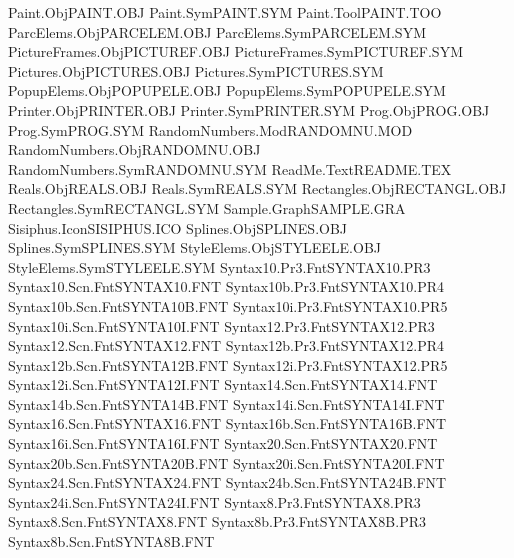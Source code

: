 Paint.Obj                       PAINT.OBJ    
Paint.Sym                       PAINT.SYM    
Paint.Tool                      PAINT.TOO    
ParcElems.Obj                   PARCELEM.OBJ 
ParcElems.Sym                   PARCELEM.SYM 
PictureFrames.Obj               PICTUREF.OBJ 
PictureFrames.Sym               PICTUREF.SYM 
Pictures.Obj                    PICTURES.OBJ 
Pictures.Sym                    PICTURES.SYM 
PopupElems.Obj                  POPUPELE.OBJ 
PopupElems.Sym                  POPUPELE.SYM 
Printer.Obj                     PRINTER.OBJ  
Printer.Sym                     PRINTER.SYM  
Prog.Obj                        PROG.OBJ     
Prog.Sym                        PROG.SYM     
RandomNumbers.Mod               RANDOMNU.MOD 
RandomNumbers.Obj               RANDOMNU.OBJ 
RandomNumbers.Sym               RANDOMNU.SYM 
ReadMe.Text                     README.TEX   
Reals.Obj                       REALS.OBJ    
Reals.Sym                       REALS.SYM    
Rectangles.Obj                  RECTANGL.OBJ 
Rectangles.Sym                  RECTANGL.SYM 
Sample.Graph                    SAMPLE.GRA   
Sisiphus.Icon                   SISIPHUS.ICO 
Splines.Obj                     SPLINES.OBJ  
Splines.Sym                     SPLINES.SYM  
StyleElems.Obj                  STYLEELE.OBJ 
StyleElems.Sym                  STYLEELE.SYM 
Syntax10.Pr3.Fnt                SYNTAX10.PR3 
Syntax10.Scn.Fnt                SYNTAX10.FNT 
Syntax10b.Pr3.Fnt               SYNTAX10.PR4 
Syntax10b.Scn.Fnt               SYNTA10B.FNT 
Syntax10i.Pr3.Fnt               SYNTAX10.PR5 
Syntax10i.Scn.Fnt               SYNTA10I.FNT 
Syntax12.Pr3.Fnt                SYNTAX12.PR3 
Syntax12.Scn.Fnt                SYNTAX12.FNT 
Syntax12b.Pr3.Fnt               SYNTAX12.PR4 
Syntax12b.Scn.Fnt               SYNTA12B.FNT 
Syntax12i.Pr3.Fnt               SYNTAX12.PR5 
Syntax12i.Scn.Fnt               SYNTA12I.FNT 
Syntax14.Scn.Fnt                SYNTAX14.FNT 
Syntax14b.Scn.Fnt               SYNTA14B.FNT 
Syntax14i.Scn.Fnt               SYNTA14I.FNT 
Syntax16.Scn.Fnt                SYNTAX16.FNT 
Syntax16b.Scn.Fnt               SYNTA16B.FNT 
Syntax16i.Scn.Fnt               SYNTA16I.FNT 
Syntax20.Scn.Fnt                SYNTAX20.FNT 
Syntax20b.Scn.Fnt               SYNTA20B.FNT 
Syntax20i.Scn.Fnt               SYNTA20I.FNT 
Syntax24.Scn.Fnt                SYNTAX24.FNT 
Syntax24b.Scn.Fnt               SYNTA24B.FNT 
Syntax24i.Scn.Fnt               SYNTA24I.FNT 
Syntax8.Pr3.Fnt                 SYNTAX8.PR3  
Syntax8.Scn.Fnt                 SYNTAX8.FNT  
Syntax8b.Pr3.Fnt                SYNTAX8B.PR3 
Syntax8b.Scn.Fnt                SYNTA8B.FNT  
